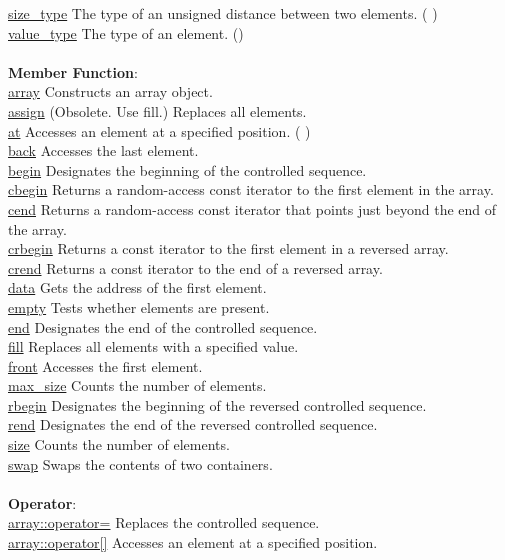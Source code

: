 {\underline{size_type}	The type of an unsigned distance between two elements. (  ) \\
\underline{value_type}	The type of an element. () \\
\\
\textbf{Member Function}: \\
\underline{array}	Constructs an array object. \\
\underline{assign}	(Obsolete. Use fill.) Replaces all elements. \\
\underline{at}	Accesses an element at a specified position. (  ) \\
\underline{back}	Accesses the last element. \\
\underline{begin}	Designates the beginning of the controlled sequence. \\
\underline{cbegin}	Returns a random-access const iterator to the first element in the array. \\
\underline{cend}	Returns a random-access const iterator that points just beyond the end of the array. \\
\underline{crbegin}	Returns a const iterator to the first element in a reversed array. \\
\underline{crend}	Returns a const iterator to the end of a reversed array. \\
\underline{data}	Gets the address of the first element. \\
\underline{empty}	Tests whether elements are present. \\
\underline{end}	Designates the end of the controlled sequence. \\
\underline{fill}	Replaces all elements with a specified value. \\
\underline{front}	Accesses the first element. \\
\underline{max_size}	Counts the number of elements. \\
\underline{rbegin}	Designates the beginning of the reversed controlled sequence. \\
\underline{rend}	Designates the end of the reversed controlled sequence. \\
\underline{size}	Counts the number of elements. \\
\underline{swap}	Swaps the contents of two containers. \\
\\
\textbf{Operator}:\\
\underline{array::operator=}	Replaces the controlled sequence.\\
\underline{array::operator[]}	Accesses an element at a specified position.\\
}

